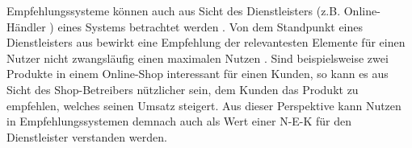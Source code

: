 Empfehlungssysteme können auch aus Sicht des Dienstleisters (z.B. Online-Händler \cite[S. 1]{jannach:article}\cite[S. 231]{sahoo:article}\cite[S. 347]{abdollahpouri:inproceedings}) eines Systems betrachtet werden \cite[S. 2]{jannach:2:inproceedings}.
Von dem Standpunkt eines Dienstleisters aus bewirkt eine Empfehlung der relevantesten Elemente für einen Nutzer nicht zwangsläufig einen maximalen Nutzen \cite[S. 1]{jannach:article}.
Sind beispielsweise zwei Produkte in einem Online-Shop interessant für einen Kunden, so kann es aus Sicht des Shop-Betreibers nützlicher sein, dem Kunden das Produkt zu empfehlen, welches seinen Umsatz steigert.
Aus dieser Perspektive kann Nutzen in Empfehlungssystemen demnach auch als Wert einer \ac{N-E-K} für den Dienstleister verstanden werden.

